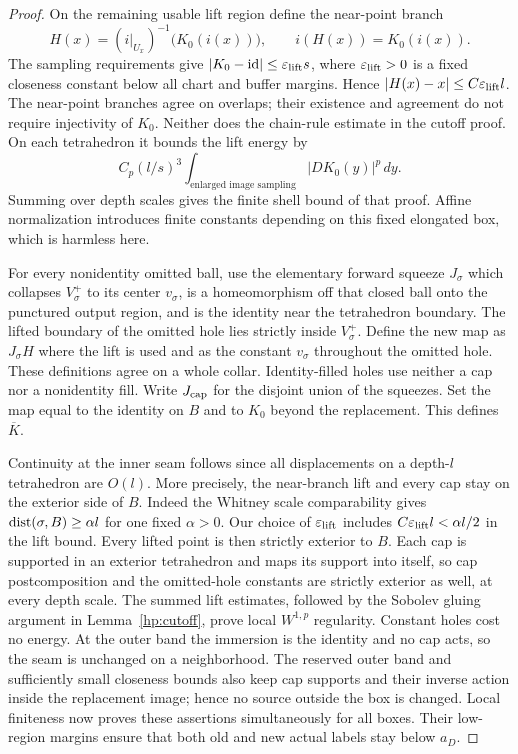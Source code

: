 \begin{proof}
On the remaining usable lift region define the near-point branch
\begin{equation}\label{qt:central-lift}
 H(x)=(i|_{U_x})^{-1}\bigl(K_0(i(x))\bigr),
 \qquad i(H(x))=K_0(i(x)).
\end{equation}
The sampling requirements give
$|K_0-\mathrm{id}|\le\varepsilon_{\rm lift}s$, where
$\varepsilon_{\rm lift}>0$ is a fixed closeness constant below all
chart and buffer margins.  Hence
$|H(x)-x|\le C\varepsilon_{\rm lift}l$.
The near-point branches agree on overlaps;
their existence and agreement do not require injectivity of $K_0$.
Neither does the chain-rule estimate in the cutoff proof.  On each
tetrahedron it bounds the lift energy by
\[
 C_p(l/s)^3
       \int_{\text{enlarged image sampling}} |DK_0(y)|^p\,dy.
\]
Summing over depth scales gives the finite shell bound of that
proof.  Affine normalization introduces finite constants depending
on this fixed elongated box, which is harmless here.

For every nonidentity omitted ball, use the elementary forward
squeeze $J_{\sigma}$ which collapses $V_{\sigma}^+$ to its center $v_{\sigma}$, is a
homeomorphism off that closed ball onto the punctured output
region, and is the identity near the tetrahedron boundary.
The lifted boundary of the omitted hole lies strictly inside
$V_{\sigma}^+$.  Define the new map as $J_{\sigma}H$ where the lift is used and
as the constant $v_{\sigma}$ throughout the omitted hole.  These definitions
agree on a whole collar.  Identity-filled holes use neither a cap
nor a nonidentity fill.  Write $J_{\rm cap}$ for the disjoint union
of the squeezes.  Set the map equal to the identity on $B$ and to
$K_0$ beyond the replacement.  This defines $\overline K$.

Continuity at the inner seam follows since all displacements on a
depth-$l$ tetrahedron are $O(l)$.  More precisely, the near-branch
lift and every cap stay on the exterior side of $B$.  Indeed the
Whitney scale comparability gives $\operatorname{dist}(\sigma,B)\geq\alpha l$ for one
fixed $\alpha>0$.  Our choice of $\varepsilon_{\rm lift}$ includes
$C\varepsilon_{\rm lift}l<\alpha l/2$ in the lift bound.
Every lifted point is then strictly exterior to $B$.  Each
cap is supported in an exterior tetrahedron and maps its support into
itself, so cap postcomposition and the omitted-hole constants are
strictly exterior as well, at every depth scale.  The summed lift estimates, followed by the Sobolev gluing argument in
Lemma~\ref{hp:cutoff}, prove local $W^{1,p}$ regularity.  Constant
holes cost no energy.  At the outer band the immersion is the
identity and no cap acts, so the seam is unchanged on a neighborhood.
The reserved outer band and sufficiently small closeness bounds also
keep cap supports and their inverse action inside the replacement
image; hence no source outside the box is changed.  Local finiteness
now proves these assertions simultaneously for all boxes.  Their
low-region margins ensure that both old and new actual labels stay
below $a_D$.


\end{proof}
